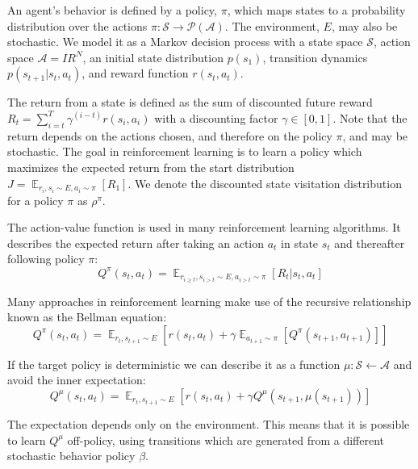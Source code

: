 \documentclass{article} %
\newcommand{\RR}{I\!\!R} %
\DeclareMathOperator{\E}{\mathbb{E}} %
\begin{document}
An agent's behavior is defined by a policy, $\pi$, which maps states
to a probability distribution over the actions $ \pi \colon
\mathcal{S} \to \mathcal{P(A)} $. The environment, $E$, may also be
stochastic.  We model it as a Markov decision process with a state
space $\mathcal{S}$, action space $\mathcal{A} = \RR^N$, an initial
state distribution $p(s_1)$, transition dynamics $p(s_{t+1} | s_t,
a_t)$, and reward function $r(s_t, a_t)$.

The return from a state is defined as the sum of discounted future reward
$R_t = \sum_{i = t}^{T} \gamma^{(i - t)} r(s_i, a_i) $
with a discounting factor
$\gamma \in [0, 1] $. Note that the return depends on the actions
chosen, and therefore on the policy $ \pi $, and may be stochastic.
The goal in reinforcement learning is
to learn a policy which maximizes the expected return from the start
distribution $J = \E_{r_i, s_i \sim E, a_i \sim \pi} \left[ R_1 \right ]$. We
denote the discounted state
visitation distribution for a policy $\pi$ as $\rho^\pi$.

The action-value function is used in many reinforcement learning algorithms. It
describes the expected return after taking an action $a_t$ in state $s_t$ and
thereafter following policy $\pi$:
\begin{equation}
  Q^\pi(s_t, a_t) = \E_{r_{i \ge t}, s_{i > t} \sim E, a_{i > t} \sim \pi} \left[ R_t | s_t, a_t \right ]
\end{equation}

Many approaches in reinforcement learning make use of the recursive
relationship known as the Bellman equation:
\begin{equation} \label{eq:bellndet}
  Q^{\pi}(s_t, a_t) = \E_{r_t, s_{t+1} \sim E} \left[ r(s_t, a_t) +
    \gamma \E_{a_{t + 1} \sim \pi} \left[
      Q^{\pi}(s_{t+1}, a_{t + 1}) \right]  \right]
\end{equation}

If the target policy is deterministic we can describe it as a function
$\mu: \mathcal{S} \leftarrow \mathcal{A}$ and avoid the inner expectation:
\begin{equation} \label{eq:bell}
  Q^{\mu}(s_t, a_t) = \E_{r_t, s_{t+1} \sim E} \left [ r(s_t, a_t) +
    \gamma
      Q^{\mu}(s_{t+1}, \mu(s_{t + 1})) \right]
\end{equation}

The expectation depends only on the environment.
This means that it is possible to learn $Q^{\mu}$ off-policy, using
transitions which are generated from a different stochastic
behavior policy $\beta$.
\end{document}

